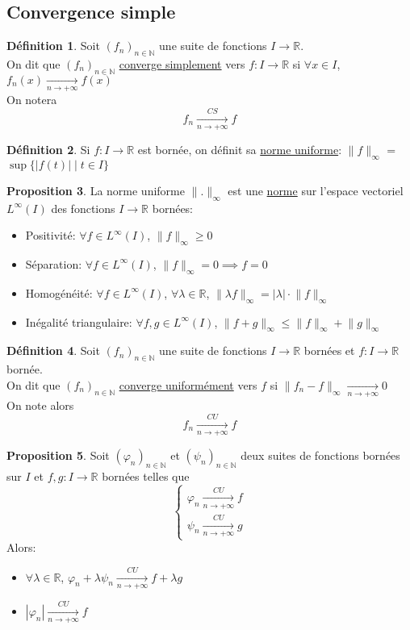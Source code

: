 \documentclass[10pt,a4paper]{article}
\theoremstyle{definition}
\newtheorem{proposition}{Proposition}[section]
\newtheorem{definition}[proposition]{Définition}
\begin{document}
\subsection{Convergence simple}

\begin{definition}
Soit $(f_n)_{n \in \mathbb{N}}$ une suite de fonctions $I \rightarrow \mathbb{R}$. \\
On dit que $(f_n)_{n \in \mathbb{N}}$ \uline{converge simplement} vers $f: I \to \mathbb{R}$ si $\forall x \in I$, $f_n(x) \xrightarrow[n \to +\infty]{} f(x)$ \\
On notera
\[f_n \xrightarrow[n \to +\infty]{CS} f\]
\end{definition}
\begin{definition}
Si $f: I \to \mathbb{R}$ est bornée, on définit sa \uline{norme uniforme}: $ \lVert f \rVert_\infty$ = $\sup{\{ |f(t)| \mid t \in I \}}$
\end{definition}
\begin{proposition}
La norme uniforme $\lVert . \rVert_\infty$ est une \uline{norme} sur l'espace vectoriel $L^\infty(I)$ des fonctions $I \to \mathbb{R}$ bornées:
\begin{itemize}
\item Positivité: $\forall f \in L^\infty(I)$, $\lVert f \rVert_\infty \geq 0$
\item Séparation: $\forall f \in L^\infty(I)$, $\lVert f \rVert_\infty = 0 \implies f = 0$
\item Homogénéité: $\forall f \in L^\infty(I)$, $\forall \lambda \in \mathbb{R}$, $\lVert \lambda f \rVert_\infty = |\lambda| \cdot \lVert f \rVert_\infty$
\item Inégalité triangulaire: $\forall f, g \in L^\infty(I)$, $\lVert f + g \rVert_\infty \leq \lVert f \rVert_\infty + \lVert g \rVert_\infty$
\end{itemize}
\end{proposition}
\begin{definition}
Soit $(f_n)_{n \in \mathbb{N}}$ une suite de fonctions $I \to \mathbb{R}$ bornées et $f: I \to \mathbb{R}$ bornée. \\
On dit que $(f_n)_{n \in \mathbb{N}}$ \uline{converge uniformément} vers $f$ si $\lVert f_n - f \rVert_\infty \xrightarrow[n \to +\infty]{} 0$ \\
On note alors
\[f_n \xrightarrow[n \to +\infty]{CU} f\]
\end{definition}
\begin{proposition}
Soit $(\varphi_n)_{n \in \mathbb{N}}$ et $(\psi_n)_{n \in \mathbb{N}}$  deux suites de fonctions bornées sur $I$ et $f, g: I \to \mathbb{R}$ bornées telles que
\[\begin{cases}\varphi_n \xrightarrow[n \to +\infty]{CU} f \\
\psi_n \xrightarrow[n \to +\infty]{CU} g
\end{cases}\]
Alors:
\begin{itemize}
\item $\forall \lambda \in \mathbb{R}$, $\varphi_n + \lambda \psi_n \xrightarrow[n \to +\infty]{CU} f + \lambda g$
\item $|\varphi_n| \xrightarrow[n \to +\infty]{CU} f$ 
\end{itemize} 
\end{proposition}
\end{document}
